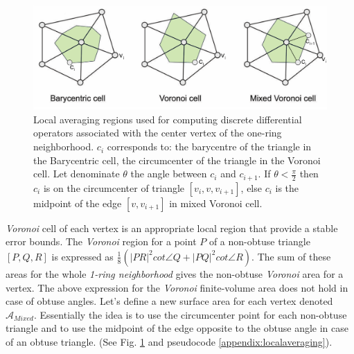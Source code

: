 \begin{figure}[!h]
    \centering
    \includegraphics[scale=0.35]{images/localregions.png}
    \caption{Local averaging regions used for computing discrete differential operators associated with the center vertex of the one-ring neighborhood. $c_i$ corresponds to: the barycentre of the triangle in the Barycentric cell, the circumcenter of the triangle in the Voronoi cell. Let denominate $\theta$ the angle between $c_i$ and $c_{i+1}$. If $\theta < \frac{\pi}{2}$ then $c_i$ is on the circumcenter of triangle $[v_i, v, v_{i+1}]$, else $c_i$ is the midpoint of the edge $[v, v_{i+1}]$ in mixed Voronoi cell.  \cite{polygonmeshprocessing}} \label{fig:localregions}
\end{figure}
\textit{Voronoi} cell of each vertex is an appropriate local region that provide a stable error bounds.
The \textit{Voronoi} region for a point $P$ of a non-obtuse triangle $[P, Q, R]$ is expressed as $\frac{1}{8}(| PR|^2 cot \angle Q + |PQ |^2 cot \angle R)$. The sum of these areas for the whole \textit{1-ring neighborhood} gives the non-obtuse \textit{Voronoi} area for a vertex. The above expression for the \textit{Voronoi} finite-volume area does not hold in case of obtuse angles. Let's define a new surface area for each vertex denoted $\mathcal{A}_{Mixed}$. Essentially the idea is to use the circumcenter point for each non-obtuse triangle and to use the midpoint of the edge opposite to the obtuse angle in case of an obtuse triangle. (See Fig. \ref{fig:localregions} and pseudocode \ref{appendix:localaveraging}). \cite{meshlab}

